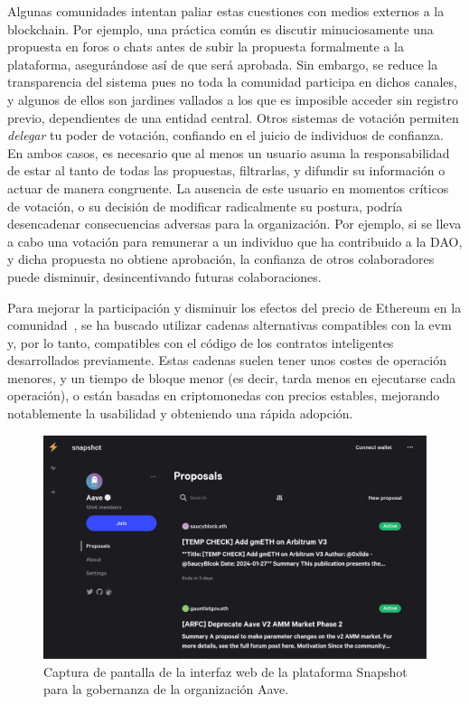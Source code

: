 Algunas comunidades intentan paliar estas cuestiones con medios externos a la blockchain. Por ejemplo, una práctica común es discutir minuciosamente una propuesta en foros o chats antes de subir la propuesta formalmente a la plataforma, asegurándose así de que será aprobada. Sin embargo, se reduce la transparencia del sistema pues no toda la comunidad participa en dichos canales, y algunos de ellos son jardines vallados a los que es imposible acceder sin registro previo, dependientes de una entidad central. Otros sistemas de votación permiten \textit{delegar} tu poder de votación, confiando en el juicio de individuos de confianza. En ambos casos, es necesario que al menos un usuario asuma la responsabilidad de estar al tanto de todas las propuestas, filtrarlas, y difundir su información o actuar de manera congruente. La ausencia de este usuario en momentos críticos de votación, o su decisión de modificar radicalmente su postura, podría desencadenar consecuencias adversas para la organización. Por ejemplo, si se lleva a cabo una votación para remunerar a un individuo que ha contribuido a la DAO, y dicha propuesta no obtiene aprobación, la confianza de otros colaboradores puede disminuir, desincentivando futuras colaboraciones.

Para mejorar la participación y disminuir los efectos del precio de Ethereum en la comunidad~\cite{faqir-rhazoui_effect_2021}, se ha buscado utilizar cadenas alternativas compatibles con la \gls{evm} y, por lo tanto, compatibles con el código de los contratos inteligentes desarrollados previamente. Estas cadenas suelen tener unos costes de operación menores, y un tiempo de bloque menor (es decir, tarda menos en ejecutarse cada operación), o están basadas en criptomonedas con precios estables, mejorando notablemente la usabilidad y obteniendo una rápida adopción.

\begin{figure}[t]
    \centering
    \includegraphics[width=\linewidth]{figures/02_sota/brave_screenshot_snapshot.org_aave.png}
    \caption{Captura de pantalla de la interfaz web de la plataforma Snapshot para la gobernanza de la organización Aave.}
    \label{fig:screenshot_snapshot-gui}
\end{figure}

